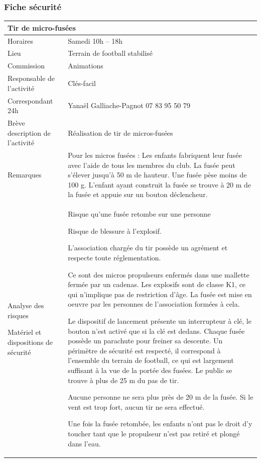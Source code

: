 \documentclass[hidelinks, paper=a4, fontsize=13pt]{report}
\begin{document}
\subsubsection{Fiche sécurité}
\begin{center}
\begin{tabular}{ | p{6cm} | p{10cm} | }
\hline
	\multicolumn{2}{|l|}{Tir de micro-fusées}  \\ \hline
	Horaires & Samedi 10h – 18h \\ \hline
	Lieu & Terrain de football stabilisé \\ \hline
	Commission & Animations \\ \hline
	Responsable de l'activité & Clés-facil \\ \hline
	Correspondant 24h & Yanaël Galliache-Pagnot 07 83 95 50 79 \\ \hline 
	Brève description de l'activité & Réalisation de tir de micros-fusées \\ \hline
	Remarques & Pour les micros fusées :
Les enfants fabriquent leur fusée avec l’aide de tous les membres du club. La fusée peut s’élever jusqu’à 50 m de hauteur. Une fusée pèse moins de 100 g. L’enfant ayant construit la fusée se trouve à 20 m de la fusée et appuie sur un bouton déclencheur. \\ \hline
Analyse des risques
	
Matériel et dispositions de sécurité & Risque qu’une fusée retombe sur une personne

Risque de blessure à l’explosif.

L’association chargée du tir possède un agrément et respecte toute réglementation.

Ce sont des micros propulseurs enfermés dans une mallette fermée par un cadenas. Les explosifs sont de classe K1, ce qui n’implique pas de restriction d’âge. La fusée est mise en oeuvre par les personnes de l’association formées à cela.

Le dispositif de lancement présente un interrupteur à clé, le bouton n’est activé que si la clé est dedans.
Chaque fusée possède un parachute pour freiner sa descente. Un périmètre de sécurité est respecté, il correspond à l’ensemble du terrain de football, ce qui est largement suffisant à la vue de la portée des fusées. Le public se trouve à plus de 25 m du pas de tir.

Aucune personne ne sera plus près de 20 m de la fusée. Si le vent est trop fort, aucun tir ne sera effectué.

Une fois la fusée retombée, les enfants n’ont pas le droit d’y toucher tant que le propulseur n’est pas retiré et plongé dans l’eau.  \\ \hline
\end{tabular}

\end{center}
\newpage
\end{document}
